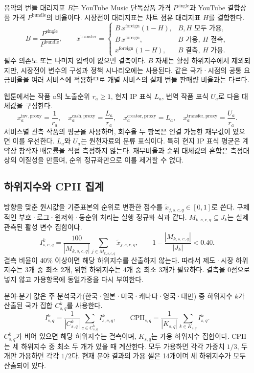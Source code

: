 \documentclass[11pt,a4paper]{report}
\begin{document}
음악의 번들 대리지표 \(B\)는 YouTube Music 단독상품 가격 \(P^{\mathrm{single}}\)과 YouTube 결합상품 가격 \(P^{\mathrm{bundle}}\)의 비율이다. 시장전이 대리지표는 차트 점유 대리지표 \(H\)를 결합한다.
\[
B=\frac{P^{\mathrm{single}}}{P^{\mathrm{bundle}}},
\qquad
x^{\mathrm{transfer}}=
\begin{cases}
B\,x^{\mathrm{foreign}}(1-H),&B,H\text{ 모두 가용},\\
B\,x^{\mathrm{foreign}},&B\text{ 가용},\ H\text{ 결측},\\
x^{\mathrm{foreign}}(1-H),&B\text{ 결측},\ H\text{ 가용}.
\end{cases}
\]
필수 의존도 또는 나머지 입력이 없으면 결측이다. \(B\) 자체는 활성 하위지수에서 제외되지만, 시장전이 변수의 구성과 정책 시나리오에는 사용된다. 같은 국가·시점의 공통 요금비율을 여러 서비스에 적용하므로 개별 서비스의 실제 번들 판매량 비율과는 다르다.

웹툰에서는 작품 \(a\)의 노출순위 \(r_a\ge1\), 현지 IP 표식 \(L_a\), 번역 작품 표식 \(U_a\)로 다음 대체값을 구성한다.
\[
x^{\mathrm{inv,proxy}}_a=\frac1{r_a},\quad
x^{\mathrm{cash,proxy}}_a=\frac{L_a}{r_a},\quad
x^{\mathrm{creator,proxy}}_a=L_a,\quad
x^{\mathrm{transfer,proxy}}_a=\frac{U_a}{r_a}.
\]
서비스별 관측 작품의 평균을 사용하며, 회수율 두 항목은 연결 가능한 재무값이 있으면 이를 우선한다. \(L_a\)와 \(U_a\)는 원천자료의 분류 표식이다. 특히 현지 IP 표식 평균은 계약상 창작자 배분률을 직접 측정하지 않는다. 재무비율과 순위 대체값의 혼합은 측정대상의 이질성을 만들며, 순위 정규화만으로 이를 제거할 수 없다.

\subsection{하위지수와 CPII 집계}
방향을 맞춘 원시값을 기준표본의 순위로 변환한 점수를 \(\tilde{x}_{j,s,c,q}\in[0,1]\)로 쓴다. 구체적인 부호·로그·윈저화·동순위 처리는 실행 정규화 식과 같다. \(M_{k,s,c,q}\subseteq J_k\)는 실제 관측된 활성 변수 집합이다.
\[
I^k_{s,c,q}=
\frac{100}{|M_{k,s,c,q}|}\sum_{j\in M_{k,s,c,q}}\tilde{x}_{j,s,c,q},
\qquad
1-\frac{|M_{k,s,c,q}|}{|J_k|}<0.40 .
\]
결측 비율이 40\% 이상이면 해당 하위지수를 산출하지 않는다. 따라서 제도·시장 하위지수는 3개 중 최소 2개, 위험 하위지수는 4개 중 최소 3개가 필요하다. 결측을 0점으로 넣지 않고 가용항목에 동일가중을 다시 부여한다.

분야-분기 값은 주 분석국가(한국·일본·미국·캐나다·영국·대만) 중 하위지수 \(k\)가 산출된 국가 집합 \(C^k_{s,q}\)를 사용한다.
\[
I^k_{s,q}=\frac1{|C^k_{s,q}|}\sum_{c\in C^k_{s,q}}I^k_{s,c,q},
\qquad
\mathrm{CPII}_{s,q}=
\frac1{|K_{s,q}|}\sum_{k\in K_{s,q}}I^k_{s,q}.
\]
\(C^k_{s,q}\)가 비어 있으면 해당 하위지수는 결측이며, \(K_{s,q}\)는 가용 하위지수 집합이다. CPII는 세 하위지수 중 최소 두 개가 있을 때 계산한다. 모두 가용하면 각각 가중치 \(1/3\), 두 개만 가용하면 각각 \(1/2\)다. 현재 분야 결과의 가용 셀은 14개이며 세 하위지수가 모두 산출되어 있다.
\end{document}

